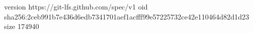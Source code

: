 version https://git-lfs.github.com/spec/v1
oid sha256:2ceb991b7e436d6edb7341701aef1acfff99e57225732ce42e110464d82d1d23
size 174940
